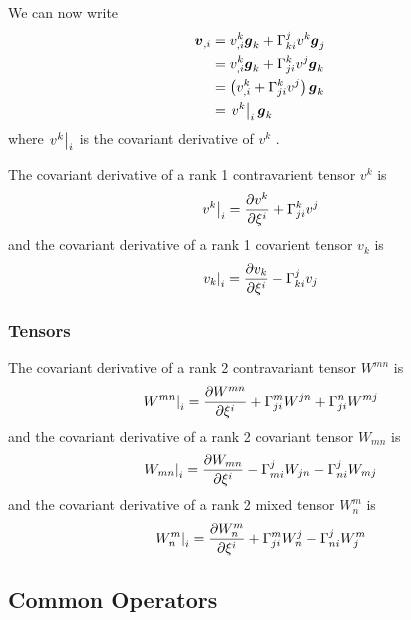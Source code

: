 We can now write
\begin{equation}
  \begin{split}
    \vect{v}_{,i}&=v^{k}_{,i}\vect{g}_{k}+\christoffel{k}{i}{j}v^{k}\vect{g}_{j}\\
    &=v^{k}_{,i}\vect{g}_{k}+\christoffel{j}{i}{k}v^{j}\vect{g}_{k}\\
    &=\pbrac{v^{k}_{,i}+\christoffel{j}{i}{k}v^{j}}\vect{g}_{k}\\
    &=\covarderiv{v^{k}}{i}\vect{g}_{k}
  \end{split}
\end{equation}
where $ \left. v^{k} \right|_{i} $ is the covariant derivative of $v^{k}$ . 

The covariant derivative of a rank 1 contravarient tensor $v^{k}$ is
\begin{equation}
   \left. v^{k} \right|_{i}  = \dfrac{\partial v^{k}}{\partial \xi^{i}} + \Gamma_{ji}^{k} v^{j}
\end{equation}
and the covariant derivative of a rank 1 covarient tensor $v_{k}$ is
\begin{equation}
   \left. v_{k} \right|_{i}  = \dfrac{\partial v_{k}}{\partial \xi^{i}} - \Gamma_{ki}^{j} v_{j}
\end{equation}

\subsubsection{Tensors}

The covariant derivative of a rank 2 contravariant tensor $W^{mn}$ is
\begin{equation}
   \left. W^{mn} \right|_{i} = \dfrac{\partial W^{mn}}{\partial \xi^{i}} + \Gamma_{ji}^{m} W^{jn}+ \Gamma_{ji}^{n} W^{mj}
\end{equation}
and the covariant derivative of a rank 2 covariant tensor $W_{mn}$ is
\begin{equation}
   \left. W_{mn} \right|_{i} = \dfrac{\partial W_{mn}}{\partial \xi^{i}} - \Gamma_{mi}^{j} W_{jn}- \Gamma_{ni}^{j} W_{mj}
\end{equation}
and the covariant derivative of a rank 2 mixed tensor $W^{m}_{n}$ is
\begin{equation}
   \left. W^{m}_{n} \right|_{i} = \dfrac{\partial W^{m}_{n}}{\partial \xi^{i}} + \Gamma_{ji}^{m} W^{j}_{n}- \Gamma_{ni}^{j} W^{m}_{j}
\end{equation}

\subsection{Common Operators}

